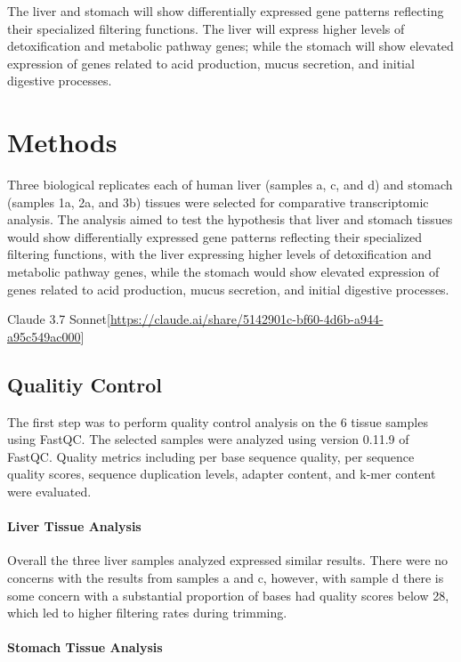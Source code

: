 \documentclass[
]{article}
\begin{document}
The liver and stomach will show differentially expressed gene patterns
reflecting their specialized filtering functions. The liver will express
higher levels of detoxification and metabolic pathway genes; while the
stomach will show elevated expression of genes related to acid
production, mucus secretion, and initial digestive processes.

\section{Methods}\label{methods}

Three biological replicates each of human liver (samples a, c, and d)
and stomach (samples 1a, 2a, and 3b) tissues were selected for
comparative transcriptomic analysis. The analysis aimed to test the
hypothesis that liver and stomach tissues would show differentially
expressed gene patterns reflecting their specialized filtering
functions, with the liver expressing higher levels of detoxification and
metabolic pathway genes, while the stomach would show elevated
expression of genes related to acid production, mucus secretion, and
initial digestive processes.

Claude 3.7
Sonnet{[}\url{https://claude.ai/share/5142901c-bf60-4d6b-a944-a95c549ac000}{]}

\subsection{Qualitiy Control}\label{qualitiy-control}

The first step was to perform quality control analysis on the 6 tissue
samples using FastQC. The selected samples were analyzed using version
0.11.9 of FastQC. Quality metrics including per base sequence quality,
per sequence quality scores, sequence duplication levels, adapter
content, and k-mer content were evaluated.

\paragraph{Liver Tissue Analysis}\label{liver-tissue-analysis}

Overall the three liver samples analyzed expressed similar results.
There were no concerns with the results from samples a and c, however,
with sample d there is some concern with a substantial proportion of
bases had quality scores below 28, which led to higher filtering rates
during trimming.

\paragraph{Stomach Tissue Analysis}\label{stomach-tissue-analysis}
\end{document}
